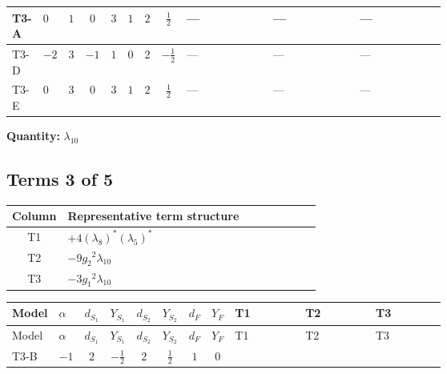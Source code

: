 \documentclass[8pt]{article}
\begin{document}
\begin{landscape}
\begin{longtable}{@{}llcccccc >{\raggedright\arraybackslash}p{0.21\linewidth} >{\raggedright\arraybackslash}p{0.21\linewidth} >{\raggedright\arraybackslash}p{0.21\linewidth}@{}}
\midrule
T3-A & $0$ & $1$ & $0$ & $3$ & $1$ & $2$ & $\frac{1}{2}$ & --- & --- & --- \\
\midrule
T3-D & $-2$ & $3$ & $-1$ & $1$ & $0$ & $2$ & $-\frac{1}{2}$ & --- & --- & --- \\
\midrule
T3-E & $0$ & $3$ & $0$ & $3$ & $1$ & $2$ & $\frac{1}{2}$ & --- & --- & --- \\
\midrule
\bottomrule
\end{longtable}
\clearpage
\noindent\textbf{Quantity: }$\lambda_{10}$\par\smallskip
\subsection*{Terms 3 of 5}
\begin{center}
\begin{tabular}{@{}c >{\raggedright\arraybackslash}p{0.82\linewidth}@{}}
\toprule
Column & Representative term structure \\
\midrule
T1 & \(\displaystyle +4 \left({\lambda_8}\right)^{*} \left({\lambda_5}\right)^{*}\) \\
\midrule
T2 & \(\displaystyle -9 {g_2}^2 {\lambda_{10}}\) \\
\midrule
T3 & \(\displaystyle -3 {g_1}^2 {\lambda_{10}}\) \\
\midrule
\bottomrule
\end{tabular}
\end{center}
\smallskip
\tiny
\begin{longtable}{@{}llcccccc >{\raggedright\arraybackslash}p{0.21\linewidth} >{\raggedright\arraybackslash}p{0.21\linewidth} >{\raggedright\arraybackslash}p{0.21\linewidth}@{}}
\toprule
Model & $\alpha$ & $d_{S_1}$ & $Y_{S_1}$ & $d_{S_2}$ & $Y_{S_2}$ & $d_F$ & $Y_F$ & T1 & T2 & T3 \\
\midrule
\endfirsthead
\toprule
Model & $\alpha$ & $d_{S_1}$ & $Y_{S_1}$ & $d_{S_2}$ & $Y_{S_2}$ & $d_F$ & $Y_F$ & T1 & T2 & T3 \\
\midrule
\endhead
T3-B & $-1$ & $2$ & $-\frac{1}{2}$ & $2$ & $\frac{1}{2}$ & $1$ & $0$ & \scriptsize\adjustbox{max width=\linewidth}{$\begin{gathered} +4 \left({\lambda_8}\right)^{*} \left({\lambda_5}\right)^{*}\end{gathered}$} & \scriptsize\adjustbox{max width=\linewidth}{$\begin{gathered} -9 {g_2}^2 {\lambda_{10}}\end{gathered}$} & \scriptsize\adjustbox{max width=\linewidth}{$\begin{gathered} -3 {g_1}^2 {\lambda_{10}}\end{gathered}$} \\

\end{longtable}
\end{landscape}
\end{document}
